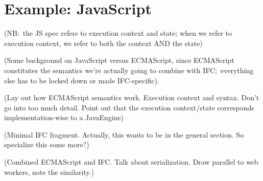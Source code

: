 \section{Example: JavaScript}
\label{sec:javascript}

(NB:\ the JS spec refers to execution context and state; when we refer to
execution context, we refer to both the context AND the state)

(Some background on JavaScript versus ECMAScript, since ECMAScript
constitutes the semantics we're actually going to combine with
IFC;\ everything else has to be locked down or made IFC-specific).

(Lay out how ECMAScript semantics work. Execution context and syntax.
Don't go into too much detail.  Point out that the execution context/state
corresponds implementation-wise to a JavaEngine)

(Minimal IFC fragment.  Actually, this wants to be in the general section.
So specialize this some more?)

(Combined ECMAScript and IFC\@. Talk about serialization. Draw parallel to web
workers, note the similarity.)
